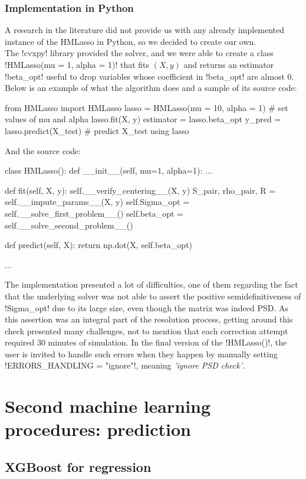 \documentclass[]{article}
\begin{document}
\subsubsection{Implementation in Python}
A research in the literature did not provide us with any already implemented instance of the HMLasso in Python, so we decided to create our own.\\
The \pyth!cvxpy! library provided the solver, and we were able to create a class \pyth!HMLasso(mu = 1, alpha = 1)! that fits $(X, y)$ and returns an estimator \pyth!beta_opt! useful to drop variables whose coefficient in \pyth!beta_opt! are almost $0$. Below is an example of what the algorithm does and a sample of its source code:
\begin{python}
	from HMLasso import HMLasso
	lasso = HMLasso(mu = 10, alpha = 1) # set values of mu and alpha
	lasso.fit(X, y)
	estimator = lasso.beta_opt
	y_pred = lasso.predict(X_test) # predict X_test using lasso
\end{python}
And the source code:
\begin{python}
	class HMLasso():
		def __init__(self, mu=1, alpha=1):
		...
		
		def fit(self, X, y):
			self.__verify_centering__(X, y)
			S_pair, rho_pair, R = self.__impute_params__(X, y)
			self.Sigma_opt = self.__solve_first_problem__()
			self.beta_opt = self.__solve_second_problem__()
			
		def predict(self, X):
			return np.dot(X, self.beta_opt)
		
		...
\end{python}
The implementation presented a lot of difficulties, one of them regarding the fact that the underlying solver was not able to assert the positive semidefinitiveness of \pyth!Sigma_opt! due to its large size, even though the matrix was indeed PSD. As this assertion was an integral part of the resolution process, getting around this check presented many challenges, not to mention that each correction attempt required 30 minutes of simulation. In the final version of the \pyth!HMLasso()!, the user is invited to handle such errors when they happen by manually setting \pyth!ERRORS_HANDLING =  "ignore"!, meaning \textit{'ignore PSD check'}.

\section{Second machine learning procedures: prediction}
\subsection{XGBoost for regression}
\end{document}
